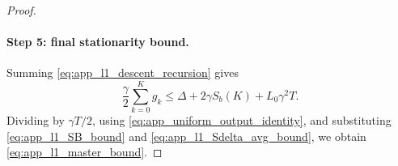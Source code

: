 \documentclass[10pt,a4paper]{amsart}
\begin{document}
\begin{proof}
\paragraph{Step 5: final stationarity bound.}
Summing \eqref{eq:app_l1_descent_recursion} gives
\[
    \frac{\gamma}{2}\sum_{k=0}^K g_k
    \le
    \Delta+2\gamma S_b(K)+L_0\gamma^2T.
\]
Dividing by \(\gamma T/2\), using
\eqref{eq:app_uniform_output_identity}, and substituting
\eqref{eq:app_l1_SB_bound} and \eqref{eq:app_l1_Sdelta_avg_bound}, we obtain
\eqref{eq:app_l1_master_bound}.
\end{proof}
\end{document}
